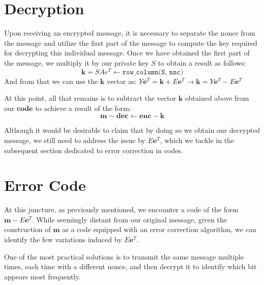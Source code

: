 \section{Decryption}
Upon receiving an encrypted message, it is necessary to separate the nonce from the message and utilize the first part of the message to compute the key required for decrypting this individual message. Once we have obtained the first part of the message, we multiply it by our private key $S$ to obtain a result as follows:
$$
\mathbf{k}=SAe^T\leftarrow \texttt{row\_column(S, nnc)}
$$
And from that we can use the \(\mathbf{k}\) vector as: $Y\mathbf{e}^T=\mathbf{k} + E\mathbf{e}^T\rightarrow \mathbf{k} = Y\mathbf{e}^T - E\mathbf{e}^T$

At this point, all that remains is to subtract the vector $\mathbf{k}$ obtained above from our $\mathbf{code}$ to achieve a result of the form:
$$
\mathbf{m}\sim \mathbf{dec}\leftarrow \mathbf{enc} - \mathbf{k}
$$

Although it would be desirable to claim that by doing so we obtain our decrypted message, we still need to address the issue by $E\mathbf{e}^T$, which we tackle in the subsequent section dedicated to error correction in codes.
\section{Error Code}
At this juncture, as previously mentioned, we encounter a code of the form $\mathbf{m}-E\mathbf{e}^T$. While seemingly distant from our original message, given the construction of $\mathbf{m}$ as a code equipped with an error correction algorithm, we can identify the few variations induced by $E\mathbf{e}^T$.

One of the most practical solutions is to transmit the same message multiple times, each time with a different nonce, and then decrypt it to identify which bit appears most frequently.